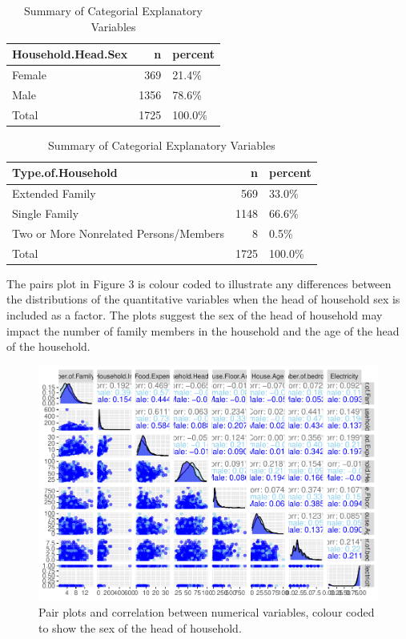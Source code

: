 \documentclass[
]{article}
\begin{document}
\begin{table}
\caption{\label{tab:categorical summaries}Summary of Categorial Explanatory Variables}

\centering
\begin{tabular}[middle]{lrl}
\toprule
Household.Head.Sex & n & percent\\
\midrule
Female & 369 & 21.4\%\\
Male & 1356 & 78.6\%\\
Total & 1725 & 100.0\%\\
\bottomrule
\end{tabular}
\centering
\begin{tabular}[middle]{lrl}
\toprule
Type.of.Household & n & percent\\
\midrule
Extended Family & 569 & 33.0\%\\
Single Family & 1148 & 66.6\%\\
Two or More Nonrelated Persons/Members & 8 & 0.5\%\\
Total & 1725 & 100.0\%\\
\bottomrule
\end{tabular}
\end{table}

The pairs plot in Figure 3 is colour coded to illustrate any differences
between the distributions of the quantitative variables when the head of
household sex is included as a factor. The plots suggest the sex of the
head of household may impact the number of family members in the
household and the age of the head of the household.

\begin{figure}[H]

{\centering \includegraphics[width=1\linewidth]{Group_01_Project2_demo_files/figure-latex/pairs-1} 

}

\caption{Pair plots and correlation between numerical variables, colour coded to show the sex of the head of household.}\label{fig:pairs}
\end{figure}
\end{document}
